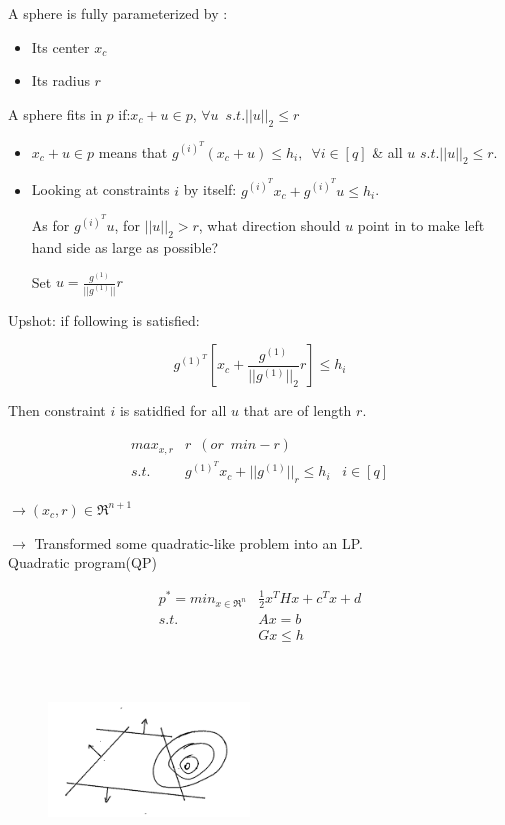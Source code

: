 A sphere is fully parameterized by :
\begin{itemize}
	\item Its center $x_c$
	
	\item Its radius $r$
\end{itemize}

A sphere fits in $p$ if:$x_c + u \in p$, $\forall u \,\,\, s.t. ||u||_2\leq r$


\begin{itemize}
	\item $x_c+u \in p$ means that $g^{(i)^T}(x_c + u) \leq h_i,\,\,\, \forall i\in [q]$ \& all $u$ $s.t. ||u||_2\leq r$.
	
	\item Looking at constraints $i$ by itself: $g^{({i})^T}x_c + g^{({i})^T}u \leq h_i$. 
	
	As for $g^{({i})^T}u$, for $||u||_2>r$, what direction should $u$ point in to make left hand side as large as possible?
	
	Set $u=\frac{g^{(1)}}{||g^{(1)}||}r$ 
\end{itemize}

Upshot: if following is satisfied:

\begin{equation*}
g^{(1)^T}[x_c + \frac{g^{(1)}}{||g^{(1)}||_2}r] \leq h_i
\end{equation*}

Then constraint $i$ is satidfied for all $u$ that are of length $r$.



\begin{align*}
max_{x, r} &r\,\,\,(or\,\,\,min -r)\\
s.t. &g^{(1)^T}x_c + ||g^{(1)}||_r\leq h_i\,\,\,\,\, i\in [q]
\end{align*}

$\rightarrow(x_c, r)\in \Re^{n+1}$

$\rightarrow$ Transformed some quadratic-like problem into an LP.\\


Quadratic program(QP)

\begin{align*}
p^* = min_{x\in \Re^n} &\frac{1}{2}x^THx + c^Tx + d\\
s.t. \,\,\, &Ax = b\\
&Gx \leq h
\end{align*}

\begin{figure}
	\centering
	\includegraphics[width=2.1in,height=2.1in]{figures/ch07/figure1016_7.png}
\end{figure}


